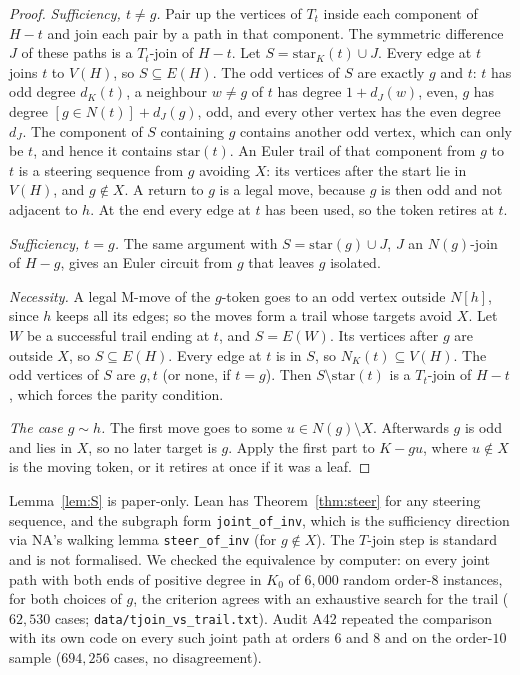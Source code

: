 \documentclass[11pt]{amsart}
\theoremstyle{definition}
\begin{document}
\begin{proof}
\emph{Sufficiency, $t\ne g$.} Pair up the vertices of $T_t$ inside each component of $H-t$ and join
each pair by a path in that component. The symmetric difference $J$ of these paths is a $T_t$-join of $H-t$.
Let $S=\mathrm{star}_K(t)\cup J$. Every edge at $t$ joins $t$ to $V(H)$, so $S\subseteq E(H)$. The odd
vertices of $S$ are exactly $g$ and $t$: $t$ has odd degree $d_K(t)$, a neighbour $w\ne g$ of $t$ has
degree $1+d_J(w)$, even, $g$ has degree $[g\in N(t)]+d_J(g)$, odd, and every other vertex has the even
degree $d_J$. The component of $S$ containing $g$
contains another odd vertex, which can only be $t$, and hence it contains $\mathrm{star}(t)$. An Euler trail of that
component from $g$ to $t$ is a steering sequence from $g$ avoiding $X$: its vertices after the start lie in $V(H)$, and
$g\notin X$. A return to $g$ is a legal move, because $g$ is then odd and not adjacent to $h$. At the end every edge at $t$ has been used, so the token retires
at $t$.

\emph{Sufficiency, $t=g$.} The same argument with $S=\mathrm{star}(g)\cup J$, $J$ an $N(g)$-join of
$H-g$, gives an Euler circuit from $g$ that leaves $g$ isolated.

\emph{Necessity.} A legal M-move of the $g$-token goes to an odd vertex outside $N[h]$, since $h$
keeps all its edges; so the moves form a trail whose targets avoid $X$. Let $W$ be a successful trail
ending at $t$, and $S=E(W)$. Its vertices after $g$ are outside $X$, so
$S\subseteq E(H)$. Every edge at $t$ is in $S$, so $N_K(t)\subseteq V(H)$. The odd vertices of $S$ are $g,t$ (or none, if
$t=g$). Then $S\setminus\mathrm{star}(t)$ is a $T_t$-join of $H-t$, which forces the parity
condition.

\emph{The case $g\sim h$.} The first move goes to some $u\in N(g)\setminus X$. Afterwards $g$ is odd and lies in $X$, so no later target is $g$.
Apply the first part to $K-gu$, where $u\notin X$ is the moving token, or it retires at once if it was a leaf.
\end{proof}

Lemma~\ref{lem:S} is paper-only. Lean has Theorem~\ref{thm:steer} for any steering sequence, and
the subgraph form \texttt{joint\_of\_inv}, which is the sufficiency direction via NA's walking lemma
\texttt{steer\_of\_inv} (for $g\notin X$). The $T$-join step is standard and is not formalised. We checked the
equivalence by computer: on every joint path with both ends of positive degree in $K_0$ of $6{,}000$
random order-$8$ instances, for both choices of $g$, the criterion agrees with an exhaustive search for
the trail ($62{,}530$ cases; \texttt{data/tjoin\_vs\_trail.txt}). Audit A42 repeated the comparison
with its own code on every such joint path at orders $6$ and $8$ and on the order-$10$ sample
($694{,}256$ cases, no disagreement).
\end{document}
